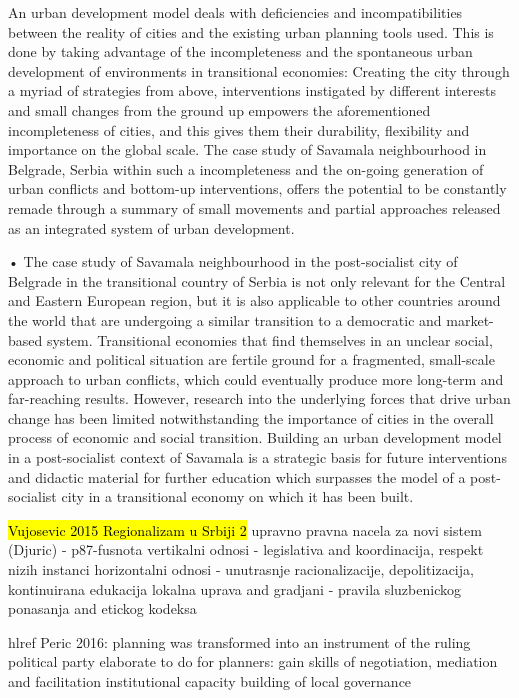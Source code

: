 \documentclass[11pt]{report}
\begin{document}
An urban development model deals with deficiencies and incompatibilities between the reality of cities and the existing urban planning tools used. This is done by taking advantage of the incompleteness and the spontaneous urban development of environments in transitional economies: Creating the city through a myriad of strategies from above, interventions instigated by different interests and small changes from the ground up empowers the aforementioned incompleteness of cities, and this gives them their durability, flexibility and importance on the global scale. The case study of Savamala neighbourhood in Belgrade, Serbia within such a incompleteness and the on-going generation of urban conflicts and bottom-up interventions, offers the potential to be constantly remade through a summary of small movements and partial approaches released as an integrated system of urban development.

•	The case study of Savamala neighbourhood in the post-socialist city of Belgrade in the transitional country of Serbia is not only relevant for the Central and Eastern European region, but it is also applicable to other countries around the world that are undergoing a similar transition to a democratic and market-based system. Transitional economies that find themselves in an unclear social, economic and political situation are fertile ground for a fragmented, small-scale approach to urban conflicts, which could eventually produce more long-term and far-reaching results. However, research into the underlying forces that drive urban change has been limited notwithstanding the importance of cities in the overall process of economic and social transition. Building an urban development model in a post-socialist context of Savamala is a strategic basis for future interventions and didactic material for further education which surpasses the model of a post-socialist city in a transitional economy on which it has been built.

\hl{Vujosevic 2015 Regionalizam u Srbiji 2}
upravno pravna nacela za novi sistem (Djuric) - p87-fusnota
    vertikalni odnosi - legislativa and koordinacija, respekt nizih instanci
    horizontalni odnosi - unutrasnje racionalizacije, depolitizacija, kontinuirana edukacija
    lokalna uprava and gradjani - pravila sluzbenickog ponasanja and etickog kodeksa
    
hl{ref Peric 2016}: planning was transformed into an instrument of the ruling political party elaborate
to do for planners:
     gain skills of negotiation, mediation and facilitation
    institutional capacity building of local governance
    
\end{document}
